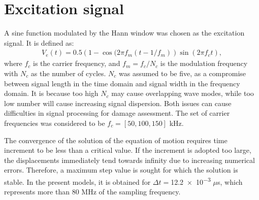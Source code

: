 \section{Excitation signal}
\label{sec:excitation}

A sine function modulated by the Hann window was chosen as the excitation signal.
It is defined as:
\begin{eqnarray}
	V_e(t) = 0.5\left(1-\cos(2\pi f_m(t-1/f_m)\right)\sin(2\pi f_ct),
\end{eqnarray}
where \(f_c\) is the carrier frequency, and \(f_m=f_c/N_c\) is the modulation frequency with \(N_c\) as the number of cycles.
\(N_c\) was assumed to be five, as a compromise between signal length in the time domain and signal width in the frequency domain.
It is because too high \(N_c\) may cause overlapping wave modes, while too low number will cause increasing signal dispersion.
Both issues can cause difficulties in signal processing for damage assessment.
The set of carrier frequencies was considered to be \(f_c=[50, 100, 150] \) \unit{\kHz}.

The convergence of the solution of the equation of motion requires time increment to be less than a critical value.
If the increment is adopted too large, the displacements immediately tend towards infinity due to increasing numerical errors.
Therefore, a maximum step value is sought for which the solution is stable. 
In the present models, it is obtained for \(\Delta t=\)\num{12.2e-3} \(\mu\)s, which represents more than 80 \unit{\MHz} of the sampling frequency.
